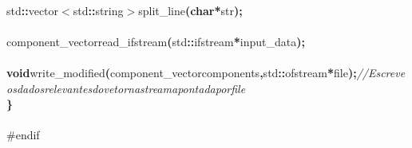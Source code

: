 \documentclass[a4paper, 11pt]{article}
\newcommand\SPC{\hspace*{0.6em}}
\newcommand{\CppAComment}[1]{\textit{\textcolor[rgb]{0.2,0.6,1}{#1}}}
\newcommand{\CppAIdentifier}[1]{#1}
\newcommand{\CppAPreprocessor}[1]{\textcolor[rgb]{0,0.5,0}{#1}}
\newcommand{\CppAReservedWord}[1]{\textbf{#1}}
\newcommand{\CppASpace}[1]{\colorbox[rgb]{1,1,1}{#1}}
\newcommand{\CppASymbol}[1]{\textbf{\textcolor[rgb]{1,0,0}{#1}}}
\begin{document}
\begin{ttfamily}
\\
\CppASpace{\SPC \SPC \SPC \SPC }\CppAIdentifier{std}\CppASymbol{::}\CppAIdentifier{vector}\CppASymbol{$<$}\CppAIdentifier{std}\CppASymbol{::}\CppAIdentifier{string}\CppASymbol{$>$}\CppASpace{\SPC }\CppAIdentifier{split\_line}\CppASymbol{(}\CppAReservedWord{char}\CppASpace{\SPC }\CppASymbol{*}\CppAIdentifier{str}\CppASymbol{)}\CppASymbol{;}\\
\CppASpace{\SPC \SPC \SPC \SPC }\\
\CppASpace{\SPC \SPC \SPC \SPC }\CppAIdentifier{component\_vector}\CppASpace{\SPC }\CppAIdentifier{read\_ifstream}\CppASymbol{(}\CppAIdentifier{std}\CppASymbol{::}\CppAIdentifier{ifstream}\CppASpace{\SPC }\CppASymbol{*}\CppAIdentifier{input\_data}\CppASymbol{)}\CppASymbol{;}\\
\\
\CppASpace{\SPC \SPC \SPC \SPC }\CppAReservedWord{void}\CppASpace{\SPC }\CppAIdentifier{write\_modified}\CppASymbol{(}\CppAIdentifier{component\_vector}\CppASpace{\SPC }\CppAIdentifier{components}\CppASymbol{,}\CppASpace{\SPC }\CppAIdentifier{std}\CppASymbol{::}\CppAIdentifier{ofstream}\CppASpace{\SPC }\CppASymbol{*}\CppAIdentifier{file}\CppASymbol{)}\CppASymbol{;}\CppASpace{\SPC }\CppAComment{//\SPC Escreve\SPC os\SPC dados\SPC relevantes\SPC do\SPC vetor\SPC na\SPC stream\SPC apontada\SPC por\SPC file\SPC \SPC \SPC \SPC }\\
\CppASymbol{\}}\\
\\
\CppAPreprocessor{\#endif}\\

\end{ttfamily}
\end{document}
